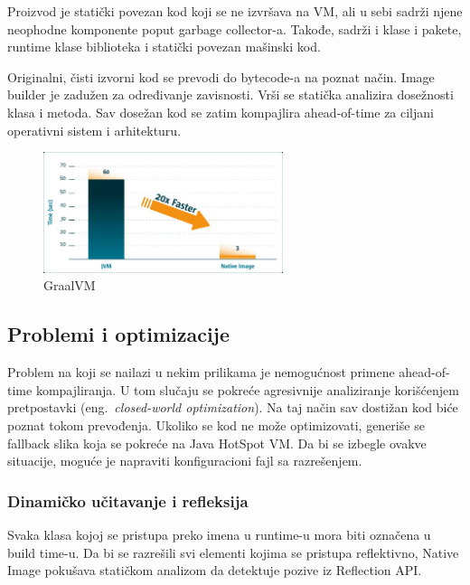 \documentclass[a4paper]{article}
\begin{document}
Proizvod je statički povezan kod koji se ne izvršava na VM, ali u sebi sadrži njene neophodne 
komponente poput garbage collector-a. Takođe, sadrži i klase i pakete,
runtime klase biblioteka i statički povezan mašinski kod. \cite{natImgGraal02}

Originalni, čisti izvorni kod se prevodi do bytecode-a na poznat način.
Image builder je zadužen za određivanje zavisnosti. Vrši se statička
analizira dosežnosti klasa i metoda. Sav dosežan kod se zatim 
kompajlira ahead-of-time za ciljani operativni sistem i arhitekturu.

\begin{figure}[h!]
  \begin{center}
      \includegraphics[width=70mm]{./pics/alibaba_pic.jpg}
  \end{center}
  \caption {GraalVM}
  \label{fig:natImg-alibaba}
\end{figure}

\subsection{Problemi i optimizacije}
\label{sec:natImg-proboptim}

Problem na koji se nailazi u nekim prilikama je nemogućnost 
primene ahead-of-time kompajliranja. U tom slučaju se pokreće 
agresivnije analiziranje korišćenjem pretpostavki (eng.~{\em closed-world optimization}). 
Na taj način sav dostižan kod biće poznat tokom prevođenja.
Ukoliko se kod ne može optimizovati, generiše se fallback slika
koja se pokreće na Java HotSpot VM. Da bi se izbegle ovakve situacije,
moguće je napraviti konfiguracioni fajl sa razrešenjem.

\subsubsection{Dinamičko učitavanje i refleksija}
\label{sec:natImg-dynRefl}
Svaka klasa kojoj se pristupa preko imena u runtime-u mora 
biti označena u build time-u.
Da bi se razrešili svi elementi kojima se pristupa reflektivno,
Native Image pokušava statičkom analizom da detektuje pozive 
iz Reflection API.
\end{document}
